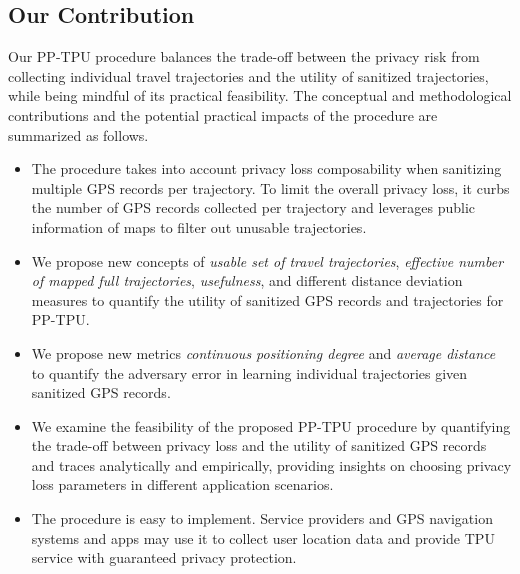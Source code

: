 \documentclass[10pt,journal,compsoc]{IEEEtran}
\begin{document}
\vspace{-9pt}\subsection{Our Contribution}\vspace{-3pt}
Our PP-TPU procedure balances the trade-off between the privacy risk from collecting  individual travel trajectories and the utility of sanitized trajectories, while being mindful of its practical feasibility. The conceptual and methodological contributions and the potential practical impacts of the procedure are summarized as follows.
\vspace{-3pt}
\begin{itemize}[leftmargin=9pt]
\item The procedure takes into account privacy loss composability when sanitizing multiple GPS records per trajectory. To limit the overall privacy loss, it curbs the number of GPS records collected per trajectory and leverages public information of maps to filter out unusable trajectories.
\item  We propose new concepts of \emph{usable set of travel trajectories}, \emph{effective number of mapped full trajectories}, \emph{usefulness}, and different distance deviation measures to quantify the utility of sanitized GPS records and trajectories for PP-TPU.  
\item  We propose new metrics \emph{continuous positioning degree} and \emph{average distance} to quantify the adversary error in learning individual trajectories given sanitized GPS records.
\item We examine the feasibility of the proposed PP-TPU procedure by quantifying the trade-off between privacy loss and the utility of sanitized GPS records and traces analytically and empirically, providing insights on choosing privacy loss parameters in different application scenarios.
\item The  procedure is easy to implement. Service providers and GPS navigation systems and apps may use it to collect user location data and provide TPU service with guaranteed privacy protection.
\end{itemize}
\end{document}
